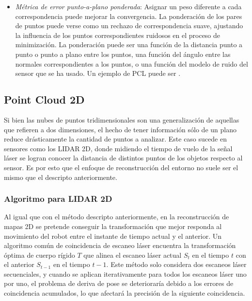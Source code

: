 \begin{itemize}
    \item \textit{Métrica de error punto-a-plano ponderada}: Asignar un peso diferente a cada correspondencia puede mejorar la convergencia. La ponderación de los pares de puntos puede verse como un rechazo de correspondencia suave, ajustando la influencia de los puntos correspondientes ruidosos en el proceso de minimización. La ponderación puede ser una función de la distancia punto a punto o punto a plano entre los puntos, una función del ángulo entre las normales correspondientes a los puntos, o una función del modelo de ruido del sensor que se ha usado. Un ejemplo de PCL puede ser .
\end{itemize}

\subsection{Point Cloud 2D}
Si bien las nubes de puntos tridimensionales son una generalización de aquellas que refieren a dos dimensiones, el hecho de tener información sólo de un plano reduce drásticamente la cantidad de puntos a analizar. Este caso sucede en sensores como los LIDAR 2D, donde midiendo el tiempo de vuelo de la señal láser se logran conocer la distancia de distintos puntos de los objetos respecto al sensor. Es por esto que el enfoque de reconstrucción del entorno no suele ser el mismo que el descripto anteriormente.

\subsubsection{Algoritmo para LIDAR 2D}
Al igual que con el método descripto anteriormente, en la reconstrucción de mapas 2D se pretende conseguir la transformación que mejor responda al movimiento del robot entre el instante de tiempo actual y el anterior. Un algoritmo común de coincidencia de escaneo láser encuentra la transformación óptima de cuerpo rígido $T$ que alinea el escaneo láser actual $S_t$ en el tiempo $t$ con el anterior $S_{t-1}$ en el tiempo $t-1$. Este método solo considera dos escaneos láser secuenciales, y cuando se aplican iterativamente para todos los escaneos láser uno por uno, el problema de deriva de pose se deterioraría debido a los errores de coincidencia acumulados, lo que afectará la precisión de la siguiente coincidencia. 

